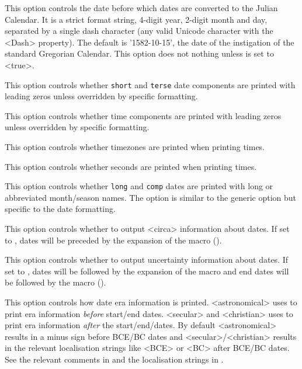 \documentclass{ltxdockit}[2011/03/25]
\begin{document}
\begin{optionlist}

This option controls the date before which dates are converted to the Julian Calendar. It is a strict format string, 4-digit year, 2-digit month and day, separated by a single dash character (any valid Unicode character with the <Dash> property). The default is '1582-10-15', the date of the instigation of the standard Gregorian Calendar. This option does not nothing unless  is set to <true>.


This option controls whether \texttt{short} and \texttt{terse} date components are printed with leading zeros unless overridden by specific formatting.


This option controls whether time components are printed with leading zeros unless overridden by specific formatting.


This option controls whether timezones are printed when printing times.


This option controls whether seconds are printed when printing times.


This option controls whether \texttt{long} and \texttt{comp} dates are printed with long or abbreviated month/season names. The option is similar to the generic  option but specific to the date formatting.


This option controls whether to output <circa> information about dates. If set to , dates will be preceded by the expansion of the  macro ().


This option controls whether to output uncertainty information about dates. If set to , dates will be followed by the expansion of the  macro and end dates will be followed by the  macro ().


This option controls how date era information is printed. <astronomical> uses  to print era information \emph{before} start/end dates. <secular> and <christian> uses  to print era information \emph{after} the start/end/dates. By default <astronomical> results in a minus sign before BCE/BC dates and <secular>/<christian> results in the relevant localisation strings like <BCE> or <BC> after BCE/BC dates. See the relevant comments in  and the localisation strings in .


\end{optionlist}
\end{document}
